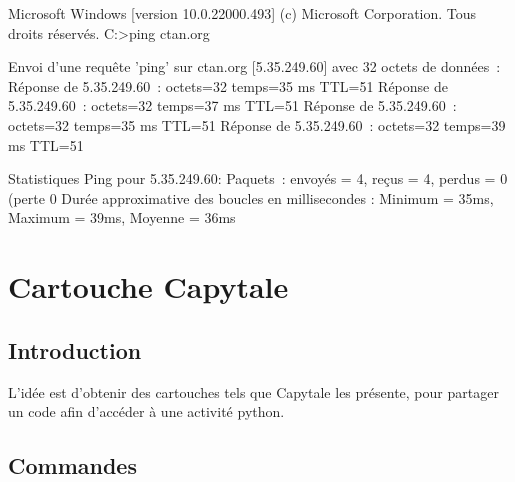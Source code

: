 \documentclass[a4paper,french,11pt]{article}
\begin{document}
\begin{codesortie}
\begin{TerminalWin}[15cm]{}
Microsoft Windows [version 10.0.22000.493]
(c) Microsoft Corporation. Tous droits réservés.
C:\Users\test>ping ctan.org

Envoi d’une requête 'ping' sur ctan.org [5.35.249.60] avec 32 octets de données :
Réponse de 5.35.249.60 : octets=32 temps=35 ms TTL=51
Réponse de 5.35.249.60 : octets=32 temps=37 ms TTL=51
Réponse de 5.35.249.60 : octets=32 temps=35 ms TTL=51
Réponse de 5.35.249.60 : octets=32 temps=39 ms TTL=51

Statistiques Ping pour 5.35.249.60:
Paquets : envoyés = 4, reçus = 4, perdus = 0 (perte 0%
Durée approximative des boucles en millisecondes :
Minimum = 35ms, Maximum = 39ms, Moyenne = 36ms
\end{TerminalWin}


\end{codesortie}

\newpage

\section{Cartouche Capytale}\label{capytale}

\subsection{Introduction}

\begin{codeidee}
L'idée est d'obtenir des \textsf{cartouches} tels que \textsf{Capytale} les présente, pour partager un code afin d'accéder à une activité \textsf{python}.
\end{codeidee}

\subsection{Commandes}
\end{document}
